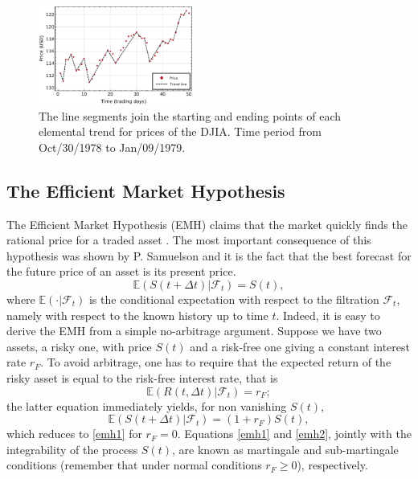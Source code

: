 \documentclass[a4paper]{jpconf}
\begin{document}
\begin{figure}
\begin{center}
\includegraphics[width=0.45\textwidth]{img/TrendReturnsVisual.pdf}
\end{center}
\caption{\small \label{fig:trends}The line segments join the starting and ending points of each elemental trend for prices of the DJIA. Time period from Oct/30/1978 to Jan/09/1979.}
\end{figure}


\subsection{The Efficient Market Hypothesis}
\label{efficient}
The Efficient Market Hypothesis (EMH) claims that the market quickly finds the rational price for a traded asset \cite{Mantegna}. The most important consequence of this hypothesis was shown by P. Samuelson \cite{Samuelson 2} and it is the fact that the best forecast for the future price of an asset is its present price.
\begin{equation}
\label{emh1}
\mathbb{E}(S(t+\Delta t)|\mathcal{F}_t ) = S(t),
\end{equation} 
where $\mathbb{E}(\cdot|\mathcal{F}_t)$ is the conditional expectation with respect to the filtration $\mathcal{F}_t$, namely with respect to the known history up to time $t$. Indeed, it is easy to derive the EMH from a simple no-arbitrage argument. Suppose we have two assets, a risky one, with price $S(t)$ and a risk-free one giving a constant interest rate $r_F$. To avoid arbitrage, one has to require that the expected return of the risky asset is equal to the risk-free interest rate, that is
\begin{equation}
\mathbb{E} (R(t, \Delta t)|\mathcal{F}_t) = r_F;
\end{equation}
the latter equation immediately yields, for non vanishing $S(t)$,
\begin{equation}
\label{emh2}
\mathbb{E}(S(t+\Delta t)|\mathcal{F}_t ) = (1+r_F) S(t),
\end{equation}
which reduces to \eqref{emh1} for $r_F = 0$. Equations \eqref{emh1} and
\eqref{emh2}, jointly with the integrability of the process $S(t)$, are known as martingale and sub-martingale conditions (remember that under normal conditions $r_F \geq 0$), respectively.
\end{document}
